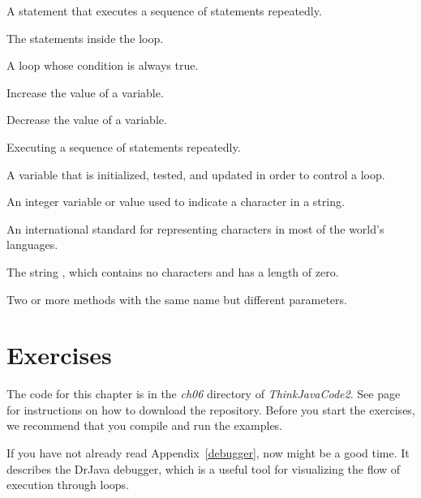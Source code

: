 \begin{description}

A statement that executes a sequence of statements repeatedly.

The statements inside the loop.

A loop whose condition is always true.

Increase the value of a variable.

Decrease the value of a variable.

Executing a sequence of statements repeatedly.

A variable that is initialized, tested, and updated in order to control a loop.

An integer variable or value used to indicate a character in a string.

An international standard for representing characters in most of the world's languages.

The string , which contains no characters and has a length of zero.

Two or more methods with the same name but different parameters.

\end{description}


\section{Exercises}

The code for this chapter is in the {\it ch06} directory of {\it ThinkJavaCode2}.
See page~\pageref{code} for instructions on how to download the repository.
Before you start the exercises, we recommend that you compile and run the examples.

If you have not already read Appendix~\ref{debugger}, now might be a good time.
It describes the DrJava debugger, which is a useful tool for visualizing the flow of execution through loops.



